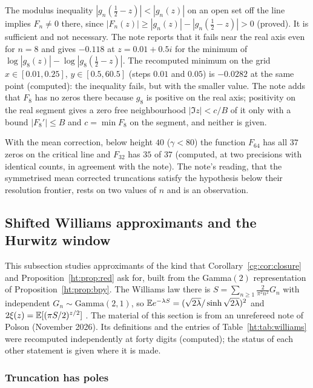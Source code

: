 The modulus inequality $|g_n(\frac12-z)|<|g_n(z)|$ on an open set off the line implies $F_n\ne0$ there, since $|F_n(z)|\ge|g_n(z)|-|g_n(\frac12-z)|>0$ (proved). It is sufficient and not necessary. The note reports that it fails near the real axis even for $n=8$ and gives $-0.118$ at $z=0.01+0.5i$ for the minimum of $\log|g_8(z)|-\log|g_8(\frac12-z)|$. The recomputed minimum on the grid $x\in[0.01,0.25]$, $y\in[0.5,60.5]$ (steps $0.01$ and $0.05$) is $-0.0282$ at the same point (computed): the inequality fails, but with the smaller value. The note adds that $F_8$ has no zeros there because $g_8$ is positive on the real axis; positivity on the real segment gives a zero free neighbourhood $|\Im z|<c/B$ of it only with a bound $|F_8'|\le B$ and $c=\min F_8$ on the segment, and neither is given.

With the mean correction, below height $40$ ($\gamma<80$) the function $F_{64}$ has all $37$ zeros on the critical line and $F_{32}$ has $35$ of $37$ (computed, at two precisions with identical counts, in agreement with the note). The note's reading, that the symmetrised mean corrected truncations satisfy the hypothesis below their resolution frontier, rests on two values of $n$ and is an observation.

\subsection{Shifted Williams approximants and the Hurwitz window}\label{ht:sec:williams}

This subsection studies approximants of the kind that Corollary~\ref{cg:cor:closure} and Proposition~\ref{ht:prop:red} ask for, built from the Gamma$(2)$ representation of Proposition~\ref{ht:prop:bpy}. The Williams law there is $S=\sum_{n\ge1}\frac{2}{\pi^2n^2}G_n$ with independent $G_n\sim\text{Gamma}(2,1)$, so $\mathbb{E} e^{-\lambda S}=(\sqrt{2\lambda}/\sinh\sqrt{2\lambda})^2$ and $2\xi(z)=\mathbb{E}[(\pi S/2)^{z/2}]$ \cite{Williams90,BPY01}. The material of this section is from an unrefereed note of Polson (November 2026). Its definitions and the entries of Table~\ref{ht:tab:williams} were recomputed independently at forty digits (computed); the status of each other statement is given where it is made.

\subsubsection{Truncation has poles}

